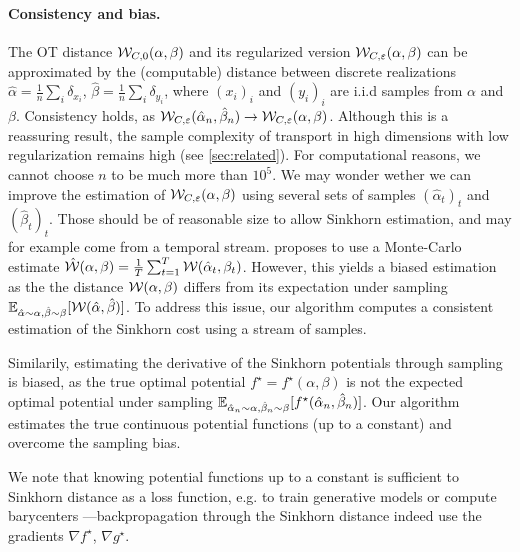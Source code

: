 \paragraph{Consistency and bias.}\label{sec:gradient}

The OT distance $\mathcal{W}_{C,0}(\alpha,\beta)$ and its regularized version
$\mathcal{W}_{C,\varepsilon}(\alpha,\beta)$ can be approximated by the (computable)
distance between discrete realizations $\hat \alpha = \frac{1}{n} \sum_i
\delta_{x_i}$, $\hat \beta = \frac{1}{n} \sum_i \delta_{y_i}$, where ${(x_i)}_i$
and ${(y_i)}_i$ are i.i.d samples from $\alpha$ and $\beta$.  Consistency holds,
as $\mathcal{W}_{C,\varepsilon}(\hat \alpha_n, \hat \beta_n) \to \mathcal{W}_{C,\varepsilon}(\alpha,
\beta)$. Although this is a reassuring result, the sample complexity of
transport in high dimensions with low regularization remains high (see
\autoref{sec:related}). For computational reasons, we cannot choose $n$ to be
much more than $10^5$. We may wonder wether we can improve the estimation of
$\mathcal{W}_{C,\varepsilon}(\alpha,\beta)$ using several sets of samples $(\hat
\alpha_t)_t$ and ${(\hat \beta_t)}_t$. Those should be of reasonable size to
allow Sinkhorn estimation, and may for example come from a temporal stream.
\citet{2018-Genevay-aistats} proposes to use a Monte-Carlo estimate $\hat
{\mathcal{W}}(\alpha, \beta) = \frac{1}{T} \sum_{t=1}^T \mathcal{W}(\hat \alpha_t, \beta_t)$.
However, this yields a biased estimation as the the distance $\mathcal{W}(\alpha,
\beta)$ differs from its expectation under sampling $\mathbb{E}_{\hat \alpha \sim
\alpha, \hat \beta \sim \beta} [\mathcal{W}(\hat \alpha, \hat \beta)]$. To address this
issue, our algorithm computes a consistent estimation of the Sinkhorn cost
using a stream of samples.

Similarily, estimating the derivative of the Sinkhorn potentials through
sampling is biased, as the true optimal potential $f^\star=f^\star(\alpha,
\beta)$ is not the expected optimal potential under sampling $\mathbb{E}_{\hat \alpha_n
\sim \alpha, \hat \beta_n \sim \beta}[f^\star(\hat \alpha_n, \hat \beta_n)]$.
Our algorithm estimates the true continuous potential functions (up to a
constant) and overcome the sampling bias.

We note that knowing potential functions up to a constant is sufficient to
Sinkhorn distance as a loss function, e.g. to train generative models or compute
barycenters \cite{staib2017parallel}---backpropagation through the Sinkhorn
distance indeed use the gradients $\nabla f^\star$, $\nabla g^\star$. 



